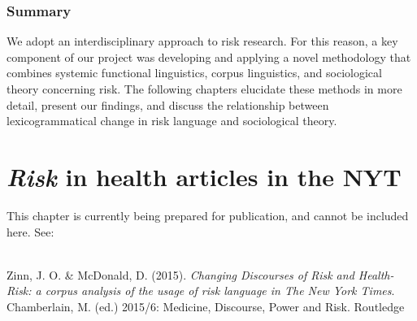 \documentclass{report}
\begin{document}
\subsection{Summary}

We adopt an interdisciplinary approach to risk research. For this reason, a key component of our project was developing and applying a novel methodology that combines systemic functional linguistics, corpus linguistics, and sociological theory concerning risk. The following chapters elucidate these methods in more detail, present our findings, and discuss the relationship between lexicogrammatical change in risk language and sociological theory.






\chapter{\emph{Risk} in health articles in the NYT}

    This chapter is currently being prepared for publication, and cannot be included here. See: 

    ~\\ 

    \noindent Zinn, J. O. \& McDonald, D. (2015). \emph{Changing Discourses of Risk and Health-Risk: a corpus analysis of the usage of risk language in The New York Times}. Chamberlain, M. (ed.) 2015/6: Medicine, Discourse, Power and Risk. Routledge






    \cleardoublepage
    \singlespacing
    \printendnotes
    \cleardoublepage
    \singlespacing
    
    
    \cleardoublepage

    
\end{document}
